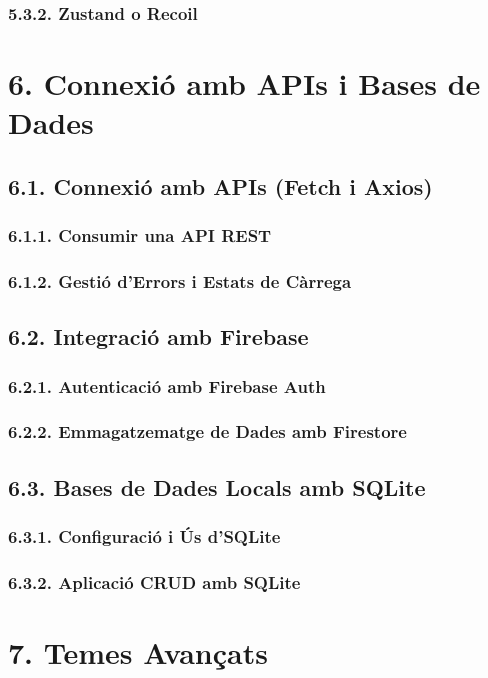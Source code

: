 \documentclass[12pt]{beamer}
\begin{document}
	\subsubsection{5.3.2. Zustand o Recoil}
	
	\section{6. Connexió amb APIs i Bases de Dades}
	
	\subsection{6.1. Connexió amb APIs (Fetch i Axios)}
	\subsubsection{6.1.1. Consumir una API REST}
	\subsubsection{6.1.2. Gestió d'Errors i Estats de Càrrega}
	
	\subsection{6.2. Integració amb Firebase}
	\subsubsection{6.2.1. Autenticació amb Firebase Auth}
	\subsubsection{6.2.2. Emmagatzematge de Dades amb Firestore}
	
	\subsection{6.3. Bases de Dades Locals amb SQLite}
	\subsubsection{6.3.1. Configuració i Ús d’SQLite}
	\subsubsection{6.3.2. Aplicació CRUD amb SQLite}
	
	\section{7. Temes Avançats}
	
\end{document}

